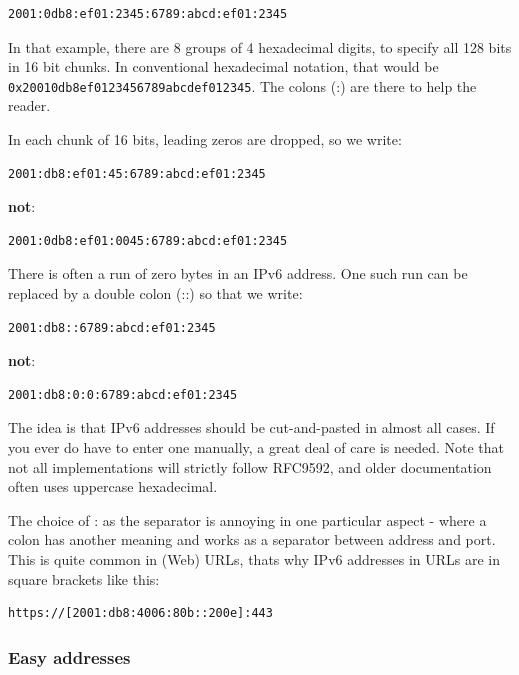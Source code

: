 \documentclass[
]{article}
\begin{document}
\begin{verbatim}
2001:0db8:ef01:2345:6789:abcd:ef01:2345
\end{verbatim}

In that example, there are 8 groups of 4 hexadecimal digits, to specify
all 128 bits in 16 bit chunks. In conventional hexadecimal notation,
that would be \texttt{0x20010db8ef0123456789abcdef012345}. The colons
(\textquotesingle:\textquotesingle) are there to help the reader.

In each chunk of 16 bits, leading zeros are dropped, so we write:

\begin{verbatim}
2001:db8:ef01:45:6789:abcd:ef01:2345
\end{verbatim}

\textbf{not}:

\begin{verbatim}
2001:0db8:ef01:0045:6789:abcd:ef01:2345
\end{verbatim}

There is often a run of zero bytes in an IPv6 address. One such run can
be replaced by a double colon (\textquotesingle::\textquotesingle) so
that we write:

\begin{verbatim}
2001:db8::6789:abcd:ef01:2345
\end{verbatim}

\textbf{not}:

\begin{verbatim}
2001:db8:0:0:6789:abcd:ef01:2345
\end{verbatim}

The idea is that IPv6 addresses should be cut-and-pasted in almost all
cases. If you ever do have to enter one manually, a great deal of care
is needed. Note that not all implementations will strictly follow
RFC9592, and older documentation often uses uppercase hexadecimal.

The choice of \textquotesingle:\textquotesingle{} as the separator is
annoying in one particular aspect - where a colon has another meaning
and works as a separator between address and port. This is quite common
in (Web) URLs, that\textquotesingle s why IPv6 addresses in URLs are in
square brackets like this:

\begin{verbatim}
https://[2001:db8:4006:80b::200e]:443
\end{verbatim}

\subsubsection{Easy addresses}\label{easy-addresses}
\end{document}
